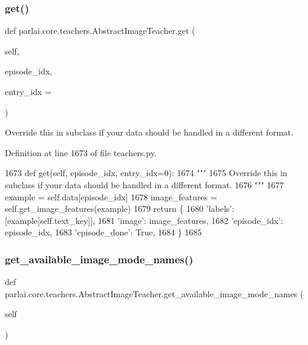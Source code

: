 \subsubsection{\texorpdfstring{get()}{get()}}
{\footnotesize\ttfamily def parlai.\+core.\+teachers.\+Abstract\+Image\+Teacher.\+get (\begin{DoxyParamCaption}\item[{}]{self,  }\item[{}]{episode\+\_\+idx,  }\item[{}]{entry\+\_\+idx = {} }\end{DoxyParamCaption})}

\begin{DoxyVerb}Override this in subclass if your data should be handled in a different format.
\end{DoxyVerb}
 

Definition at line 1673 of file teachers.\+py.


\begin{DoxyCode}
1673     \textcolor{keyword}{def }get(self, episode\_idx, entry\_idx=0):
1674         \textcolor{stringliteral}{"""}
1675 \textcolor{stringliteral}{        Override this in subclass if your data should be handled in a different format.}
1676 \textcolor{stringliteral}{        """}
1677         example = self.data[episode\_idx]
1678         image\_features = self.get\_image\_features(example)
1679         \textcolor{keywordflow}{return} \{
1680             \textcolor{stringliteral}{'labels'}: [example[self.text\_key]],
1681             \textcolor{stringliteral}{'image'}: image\_features,
1682             \textcolor{stringliteral}{'episode\_idx'}: episode\_idx,
1683             \textcolor{stringliteral}{'episode\_done'}: \textcolor{keyword}{True},
1684         \}
1685 
\end{DoxyCode}
\mbox{\label{classparlai_1_1core_1_1teachers_1_1AbstractImageTeacher_ab64513ca6c2b1c358f180ee0846b26e0}} 
\subsubsection{\texorpdfstring{get\+\_\+available\+\_\+image\+\_\+mode\+\_\+names()}{get\_available\_image\_mode\_names()}}
{\footnotesize\ttfamily def parlai.\+core.\+teachers.\+Abstract\+Image\+Teacher.\+get\+\_\+available\+\_\+image\+\_\+mode\+\_\+names (\begin{DoxyParamCaption}\item[{}]{self }\end{DoxyParamCaption})}

